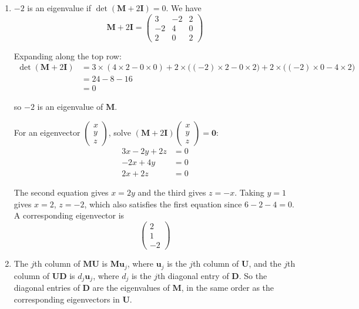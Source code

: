 \documentclass[leqno]{article}
\begin{document}
\begin{enumerate}[
  label=\textbf{\arabic*.},
  leftmargin=*,
  topsep=0pt,
  partopsep=0pt,
  parsep=0pt
]
\vspace*{10pt}

\begin{djsSolution}
\begin{enumerate}[label=\textbf{(\alph*)}, start=1]
  \item \(-2\) is an eigenvalue if \(\det(\mathbf{M}+2\mathbf{I})=0\). We have
\[
\mathbf{M}+2\mathbf{I}=\begin{pmatrix} 3 & -2 & 2 \\ -2 & 4 & 0 \\ 2 & 0 & 2 \end{pmatrix}
\]

Expanding along the top row:
\begin{align*}
\det(\mathbf{M}+2\mathbf{I}) &= 3\times(4\times 2-0\times 0)+2\times\big((-2)\times 2-0\times 2\big)+2\times\big((-2)\times 0-4\times 2\big)\\
&= 24-8-16\\
&= 0
\end{align*}

so \(-2\) is an eigenvalue of \(\mathbf{M}\).

For an eigenvector \(\begin{pmatrix}x\\y\\z\end{pmatrix}\), solve \((\mathbf{M}+2\mathbf{I})\begin{pmatrix}x\\y\\z\end{pmatrix}=\mathbf{0}\):
\begin{align*}
3x-2y+2z&=0\\
-2x+4y&=0\\
2x+2z&=0
\end{align*}

The second equation gives \(x=2y\) and the third gives \(z=-x\). Taking \(y=1\) gives \(x=2\), \(z=-2\), which also satisfies the first equation since \(6-2-4=0\). A corresponding eigenvector is
\[
\begin{pmatrix}2\\1\\-2\end{pmatrix}
\]

  \item The \(j\)th column of \(\mathbf{MU}\) is \(\mathbf{M}\mathbf{u}_j\), where \(\mathbf{u}_j\) is the \(j\)th column of \(\mathbf{U}\), and the \(j\)th column of \(\mathbf{UD}\) is \(d_j\mathbf{u}_j\), where \(d_j\) is the \(j\)th diagonal entry of \(\mathbf{D}\). So the diagonal entries of \(\mathbf{D}\) are the eigenvalues of \(\mathbf{M}\), in the same order as the corresponding eigenvectors in \(\mathbf{U}\).


\end{enumerate}
\end{djsSolution}
\end{enumerate}
\end{document}

